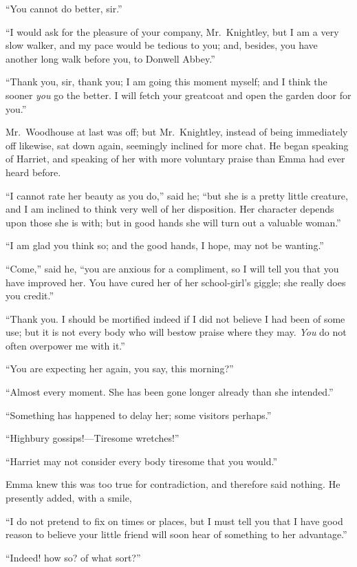 ``You cannot do better, sir.''

``I would ask for the pleasure of your company, Mr.\ Knightley,
but I am a very slow walker, and my pace would be tedious to you;
and, besides, you have another long walk before you, to Donwell Abbey.''

``Thank you, sir, thank you; I am going this moment myself; and I
think the sooner \emph{you} go the better.  I will fetch your greatcoat
and open the garden door for you.''

Mr.\ Woodhouse at last was off; but Mr.\ Knightley, instead of being
immediately off likewise, sat down again, seemingly inclined
for more chat.  He began speaking of Harriet, and speaking
of her with more voluntary praise than Emma had ever heard before.

``I cannot rate her beauty as you do,'' said he; ``but she is a
pretty little creature, and I am inclined to think very well of
her disposition.  Her character depends upon those she is with;
but in good hands she will turn out a valuable woman.''

``I am glad you think so; and the good hands, I hope, may not be wanting.''

``Come,'' said he, ``you are anxious for a compliment, so I will
tell you that you have improved her.  You have cured her of her
school-girl's giggle; she really does you credit.''

``Thank you.  I should be mortified indeed if I did not believe I
had been of some use; but it is not every body who will bestow
praise where they may.  \emph{You} do not often overpower me with it.''

``You are expecting her again, you say, this morning?''

``Almost every moment.  She has been gone longer already than
she intended.''

``Something has happened to delay her; some visitors perhaps.''

``Highbury gossips!---Tiresome wretches!''

``Harriet may not consider every body tiresome that you would.''

Emma knew this was too true for contradiction, and therefore
said nothing.  He presently added, with a smile,

``I do not pretend to fix on times or places, but I must tell you
that I have good reason to believe your little friend will soon
hear of something to her advantage.''

``Indeed! how so? of what sort?''

